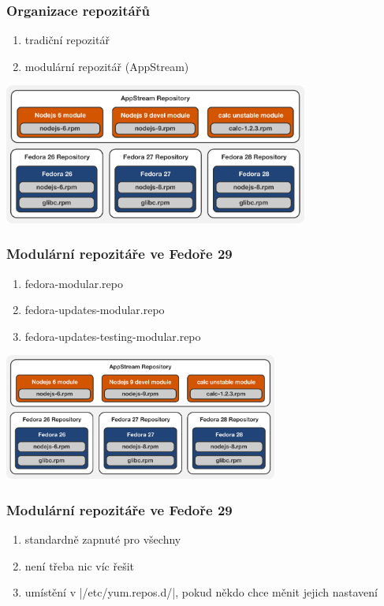 \documentclass[12pt]{beamer}
\begin{document}
\begin{frame}
\frametitle{Organizace repozitářů}

\begin{enumerate}
	\item tradiční repozitář
	\item modulární repozitář (AppStream)
\end{enumerate}

\begin{center}
	\includegraphics[width=10cm]{repos}
\end{center}
\end{frame}

\begin{frame}
\frametitle{Modulární repozitáře ve Fedoře 29}

\begin{enumerate}
	\item fedora-modular.repo
	\item fedora-updates-modular.repo
	\item fedora-updates-testing-modular.repo
\end{enumerate}

\begin{center}
	\includegraphics[width=9cm]{repos}
\end{center}
\end{frame}

\begin{frame}[fragile]
\frametitle{Modulární repozitáře ve Fedoře 29}

\begin{enumerate}
	\item standardně zapnuté pro všechny
	\item není třeba nic víc řešit
 	\item umístění v \tc|/etc/yum.repos.d/|, pokud někdo chce měnit jejich nastavení
\end{enumerate}
\end{frame}
\end{document}
